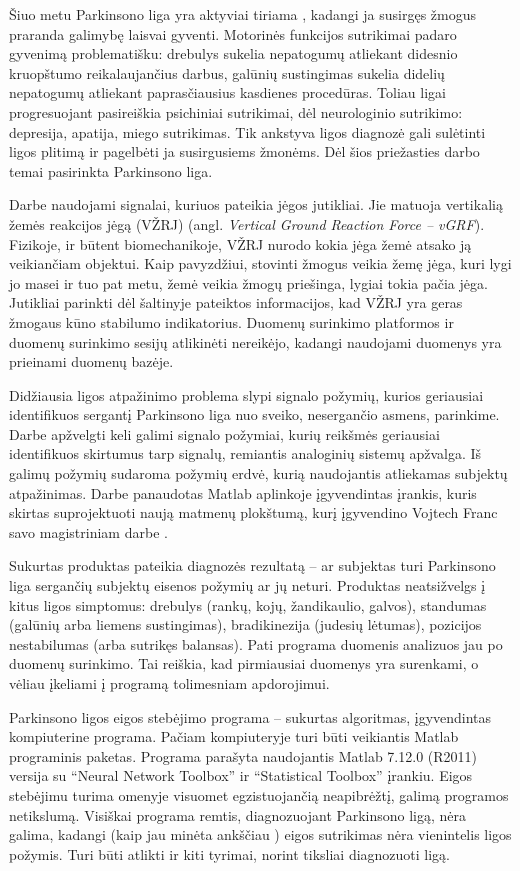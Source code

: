 \documentclass[]{vgtuef}
\begin{document}
Šiuo metu Parkinsono liga yra aktyviai tiriama \cite{vgtu}, kadangi ja susirgęs žmogus praranda galimybę laisvai gyventi. Motorinės funkcijos sutrikimai padaro gyvenimą problematišku: drebulys sukelia nepatogumų atliekant didesnio kruopštumo reikalaujančius darbus, galūnių sustingimas sukelia didelių nepatogumų atliekant paprasčiausius kasdienes procedūras. Toliau ligai progresuojant pasireiškia psichiniai sutrikimai, dėl neurologinio sutrikimo: depresija, apatija, miego sutrikimas. Tik ankstyva ligos diagnozė gali sulėtinti ligos plitimą ir pagelbėti ja susirgusiems žmonėms. Dėl šios priežasties darbo temai pasirinkta Parkinsono liga.

Darbe naudojami signalai, kuriuos pateikia jėgos jutikliai. Jie matuoja vertikalią žemės reakcijos jėgą (VŽRJ) (angl. \textit{Vertical Ground Reaction Force -- vGRF}). Fizikoje, ir būtent biomechanikoje, VŽRJ nurodo kokia jėga žemė atsako ją veikiančiam objektui. Kaip pavyzdžiui, stovinti žmogus veikia žemę jėga, kuri lygi jo masei ir tuo pat metu, žemė veikia žmogų priešinga, lygiai tokia pačia jėga. Jutikliai parinkti dėl šaltinyje \cite{S0966-6362(05)00058-5} pateiktos informacijos, kad VŽRJ yra geras žmogaus kūno stabilumo indikatorius. Duomenų surinkimo platformos ir duomenų surinkimo sesijų atlikinėti nereikėjo, kadangi naudojami duomenys yra prieinami duomenų bazėje.

Didžiausia ligos atpažinimo problema slypi signalo požymių, kurios geriausiai identifikuos sergantį Parkinsono liga nuo sveiko, nesergančio asmens, parinkime. Darbe apžvelgti keli galimi signalo požymiai, kurių reikšmės geriausiai identifikuos skirtumus tarp signalų, remiantis analoginių sistemų apžvalga. Iš galimų požymių sudaroma požymių erdvė, kurią naudojantis atliekamas subjektų atpažinimas. Darbe panaudotas Matlab aplinkoje įgyvendintas įrankis, kuris skirtas suprojektuoti naują matmenų plokštumą, kurį įgyvendino Vojtech Franc savo magistriniam darbe \cite{stprtool}. 

Sukurtas produktas pateikia diagnozės rezultatą -- ar subjektas turi Parkinsono liga sergančių subjektų eisenos požymių ar jų neturi. Produktas neatsižvelgs į kitus ligos simptomus: drebulys (rankų, kojų, žandikaulio, galvos), standumas (galūnių arba liemens sustingimas), bradikinezija (judesių lėtumas), pozicijos nestabilumas (arba sutrikęs balansas). Pati programa duomenis analizuos jau po duomenų surinkimo. Tai reiškia, kad pirmiausiai duomenys yra surenkami, o vėliau įkeliami į programą tolimesniam apdorojimui.

Parkinsono ligos eigos stebėjimo programa -- sukurtas algoritmas, įgyvendintas kompiuterine programa. Pačiam kompiuteryje turi būti veikiantis Matlab programinis paketas. Programa parašyta naudojantis Matlab 7.12.0 (R2011) versija su ``Neural Network Toolbox'' ir ``Statistical Toolbox'' įrankiu. Eigos stebėjimu turima omenyje visuomet egzistuojančią neapibrėžtį, galimą programos netikslumą. Visiškai programa remtis, diagnozuojant Parkinsono ligą, nėra galima, kadangi (kaip jau minėta ankščiau ) eigos sutrikimas nėra vienintelis ligos požymis. Turi būti atlikti ir kiti tyrimai, norint tiksliai diagnozuoti ligą.
\end{document}
